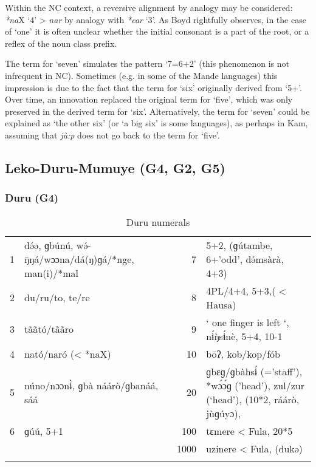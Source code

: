 Within the NC context, a reversive alignment by analogy may be considered: \textit{*na}X ‘4’ > \textit{nar} by analogy with \textit{*car} ‘3’. As Boyd rightfully observes, in the case of ‘one’ it is often unclear whether the initial consonant is a part of the root, or a reflex of the noun class prefix. 

The term for ‘seven’ simulates the pattern ‘7=6+2’ (this phenomenon is not infrequent in NC). Sometimes (e.g. in some of the Mande languages) this impression is due to the fact that the term for ‘six’ originally derived from ‘5+’. Over time, an innovation replaced the original term for ‘five’, which was only preserved in the derived term for ‘six’. Alternatively, the term for ‘seven’ could be explained as ‘the other six’ (or ‘a big six’ is some languages), as perhaps in Kam, assuming that \textit{j{\`{u}}:p} does not go back to the term for ‘five’.

\clearpage
\subsection{Leko-Duru-Mumuye (G4, G2, G5)}\footnotemark{}%
\subsubsection{Duru (G4)}%
\begin{table}
\caption{\label{tab:3:105}Duru numerals}


\begin{tabularx}{\textwidth}{lQrQ}
\lsptoprule

1 & d{\'{ə}}ə, ɡb{\'{u}}n{\'{u}}, w{\'{ə}}-{\={ŋ}}ŋá/wɔɔna/dá(ŋ)ɡá/*nge, man(i)/*mal & 7 & 5+2, (ɡ{\'{u}}tambe, 6+'odd', d{\'{ə}}msàrà, 4+3)\\
2 & du/ru/to, te/re & 8 & 4PL/4+4, 5+3,( < Hausa)\\
3 & t{\~{a}}{\~{a}}tó/t{\~{a}}{\~{a}}ro & 9 & ` one finger is left `, n{\'{ɨ}}{\`{ŋ}}s{\'{ɨ}}nè, 5+4, 10-1\\
4 & nató/naró (< *naX) & 10 & b{\={o}}ʔ, kob/kop/fób\\
5 & n{\'{u}}no/nɔɔn{\`{ɨ}}, ɡbà náárò/ɡbanáá, sáá & 20 & ɡbɛɡ/ɡbàhs{\'{ɨ}} (='staff'), *w{\'{ɔ}}{\'{ɔ}}ɡ ('head'), zul/zur (‘head'), (10*2, ráárò, j{\`{u}}ɡ{\'{u}}yɔ),\\
6 & ɡ{\'{u}}{\'{u}}, 5+1 & 100 & tɛmere < Fula, 20*5\\
&  & 1000 & uzinere < Fula, (dukə)\\
\lspbottomrule
\end{tabularx}
\end{table}

